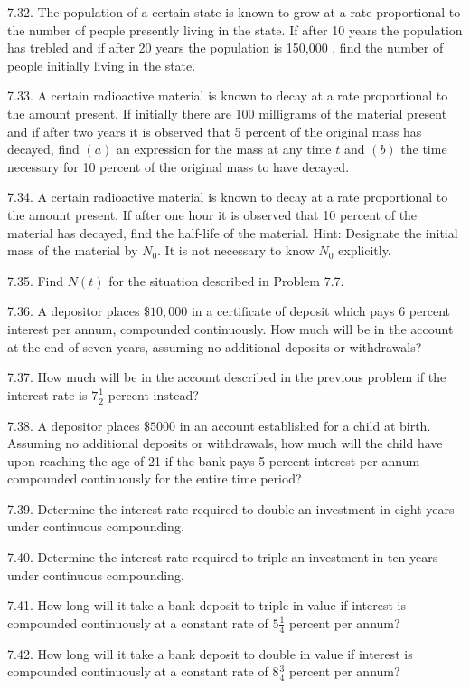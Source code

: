 \documentclass[10pt]{article}
\begin{document}
7.32. The population of a certain state is known to grow at a rate proportional to the number of people presently living in the state. If after 10 years the population has trebled and if after 20 years the population is 150,000 , find the number of people initially living in the state.

7.33. A certain radioactive material is known to decay at a rate proportional to the amount present. If initially there are 100 milligrams of the material present and if after two years it is observed that 5 percent of the original mass has decayed, find $(a)$ an expression for the mass at any time $t$ and $(b)$ the time necessary for 10 percent of the original mass to have decayed.

7.34. A certain radioactive material is known to decay at a rate proportional to the amount present. If after one hour it is observed that 10 percent of the material has decayed, find the half-life of the material. Hint: Designate the initial mass of the material by $N_{0}$. It is not necessary to know $N_{0}$ explicitly.

7.35. Find $N(t)$ for the situation described in Problem 7.7.

7.36. A depositor places $\$ 10,000$ in a certificate of deposit which pays 6 percent interest per annum, compounded continuously. How much will be in the account at the end of seven years, assuming no additional deposits or withdrawals?

7.37. How much will be in the account described in the previous problem if the interest rate is $7 \frac{1}{2}$ percent instead?

7.38. A depositor places $\$ 5000$ in an account established for a child at birth. Assuming no additional deposits or withdrawals, how much will the child have upon reaching the age of 21 if the bank pays 5 percent interest per annum compounded continuously for the entire time period?

7.39. Determine the interest rate required to double an investment in eight years under continuous compounding.

7.40. Determine the interest rate required to triple an investment in ten years under continuous compounding.

7.41. How long will it take a bank deposit to triple in value if interest is compounded continuously at a constant rate of $5 \frac{1}{4}$ percent per annum?

7.42. How long will it take a bank deposit to double in value if interest is compounded continuously at a constant rate of $8 \frac{3}{4}$ percent per annum?
\end{document}
